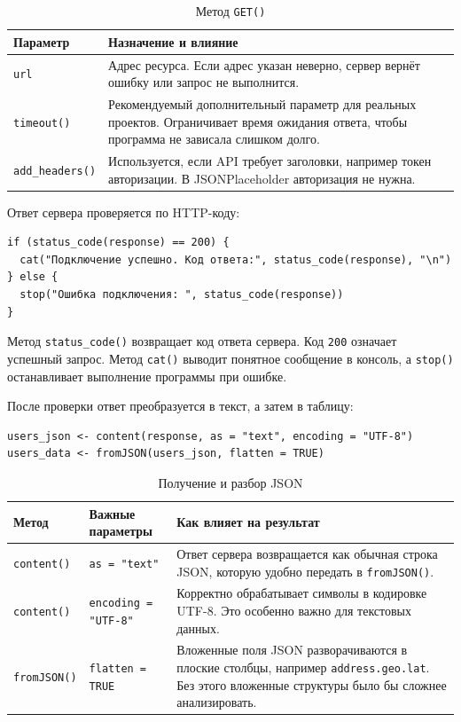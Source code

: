 \documentclass[14pt,a4paper]{extarticle}
\begin{document}
\begin{table}[H]
\caption{Метод \texttt{GET()}}
\begin{tabularx}{\textwidth}{|l|Y|}
\hline
\textbf{Параметр} & \textbf{Назначение и влияние} \\
\hline
\texttt{url} & Адрес ресурса. Если адрес указан неверно, сервер вернёт ошибку или запрос не выполнится. \\
\hline
\texttt{timeout()} & Рекомендуемый дополнительный параметр для реальных проектов. Ограничивает время ожидания ответа, чтобы программа не зависала слишком долго. \\
\hline
\texttt{add\_headers()} & Используется, если API требует заголовки, например токен авторизации. В JSONPlaceholder авторизация не нужна. \\
\hline
\end{tabularx}
\end{table}

Ответ сервера проверяется по HTTP-коду:

\begin{lstlisting}
if (status_code(response) == 200) {
  cat("Подключение успешно. Код ответа:", status_code(response), "\n")
} else {
  stop("Ошибка подключения: ", status_code(response))
}
\end{lstlisting}

Метод \texttt{status\_code()} возвращает код ответа сервера. Код \texttt{200} означает успешный запрос. Метод \texttt{cat()} выводит понятное сообщение в консоль, а \texttt{stop()} останавливает выполнение программы при ошибке.

После проверки ответ преобразуется в текст, а затем в таблицу:

\begin{lstlisting}
users_json <- content(response, as = "text", encoding = "UTF-8")
users_data <- fromJSON(users_json, flatten = TRUE)
\end{lstlisting}

\begin{table}[H]
\caption{Получение и разбор JSON}
\begin{tabularx}{\textwidth}{|l|Y|Y|}
\hline
\textbf{Метод} & \textbf{Важные параметры} & \textbf{Как влияет на результат} \\
\hline
\texttt{content()} & \texttt{as = "text"} & Ответ сервера возвращается как обычная строка JSON, которую удобно передать в \texttt{fromJSON()}. \\
\hline
\texttt{content()} & \texttt{encoding = "UTF-8"} & Корректно обрабатывает символы в кодировке UTF-8. Это особенно важно для текстовых данных. \\
\hline
\texttt{fromJSON()} & \texttt{flatten = TRUE} & Вложенные поля JSON разворачиваются в плоские столбцы, например \texttt{address.geo.lat}. Без этого вложенные структуры было бы сложнее анализировать. \\
\hline
\end{tabularx}
\end{table}
\end{document}
